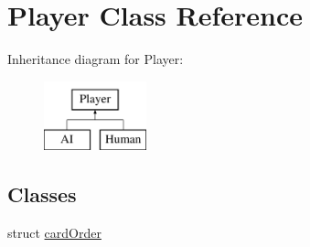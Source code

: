 \hypertarget{classPlayer}{\section{\-Player \-Class \-Reference}
\label{classPlayer}
}
\-Inheritance diagram for \-Player\-:\begin{figure}[H]
\begin{center}
\leavevmode
\includegraphics[height=2.000000cm]{classPlayer}
\end{center}
\end{figure}
\subsection*{\-Classes}
\begin{DoxyCompactItemize}
\item 
struct \hyperlink{structPlayer_1_1cardOrder}{card\-Order}
\end{DoxyCompactItemize}
